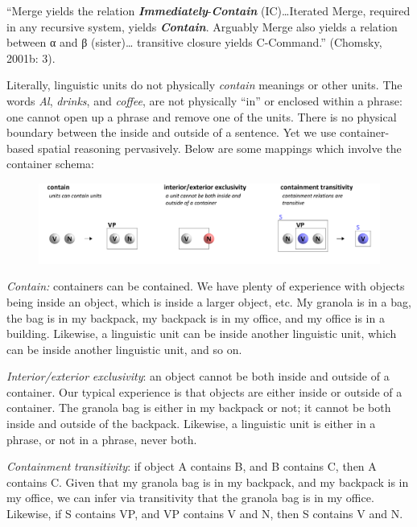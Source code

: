 “Merge yields the relation \textbf{\textit{Immediately}}{}-\textbf{\textit{Contain}} (IC)…Iterated Merge, required in any recursive system, yields \textbf{\textit{Contain}}. Arguably Merge also yields a relation between α and β (sister)… transitive closure yields C-Command.” (Chomsky, 2001b: 3).

  Literally, linguistic units do not physically \textit{contain} meanings or other units. The words \textit{Al}, \textit{drinks}, and \textit{coffee}, are not physically “in” or enclosed within a phrase: one cannot open up a phrase and remove one of the units. There is no physical boundary between the inside and outside of a sentence. Yet we use container-based spatial reasoning pervasively. Below are some mappings which involve the container schema:

  
\begin{figure}
\includegraphics[width=\textwidth]{figures/Tilsen-img32.png}
\caption{\missingcaption}
\label{fig:}
\end{figure}
 

\textit{Contain:} containers can be contained. We have plenty of experience with objects being inside an object, which is inside a larger object, etc. My granola is in a bag, the bag is in my backpack, my backpack is in my office, and my office is in a building. Likewise, a linguistic unit can be inside another linguistic unit, which can be inside another linguistic unit, and so on.

\textit{Interior/exterior} \textit{exclusivity}: an object cannot be both inside and outside of a container. Our typical experience is that objects are either inside or outside of a container. The granola bag is either in my backpack or not; it cannot be both inside and outside of the backpack. Likewise, a linguistic unit is either in a phrase, or not in a phrase, never both.

\textit{Containment} \textit{transitivity}: if object A contains B, and B contains C, then A contains C. Given that my granola bag is in my backpack, and my backpack is in my office, we can infer via transitivity that the granola bag is in my office. Likewise, if S contains VP, and VP contains V and N, then S contains V and N.

